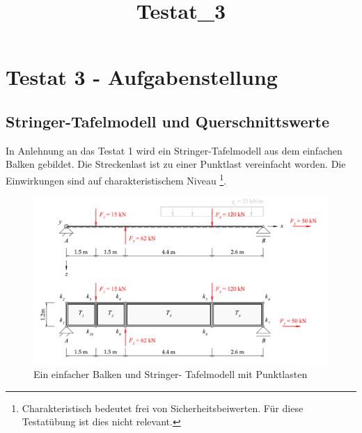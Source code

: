 \documentclass[
  12pt,
  letterpaper,
  DIV=11,
  egregdoesnotlikesansseriftitles]{scrartcl}
\title{Testat\_3}
\author{}
\date{}
\renewcommand{\maketitle}{}
\begin{document}
\maketitle
\ifdefined\Shaded\renewenvironment{Shaded}{\begin{tcolorbox}[sharp corners, interior hidden, borderline west={3pt}{0pt}{shadecolor}, enhanced, frame hidden, boxrule=0pt, breakable]}{\end{tcolorbox}}\fi

\hypertarget{testat-3---aufgabenstellung}{%
\section{Testat 3 -
Aufgabenstellung}\label{testat-3---aufgabenstellung}}

\hypertarget{stringer-tafelmodell-und-querschnittswerte}{%
\subsection{Stringer-Tafelmodell und
Querschnittswerte}\label{stringer-tafelmodell-und-querschnittswerte}}

In Anlehnung an das Testat 1 wird ein Stringer-Tafelmodell aus dem
einfachen Balken gebildet. Die Streckenlast ist zu einer Punktlast
vereinfacht worden. Die Einwirkungen sind auf charakteristischem Niveau
\footnote{Charakteristisch bedeutet frei von Sicherheitsbeiwerten. Für
  diese Testatübung ist dies nicht relevant.}.

\begin{figure}[H]

{\centering \includegraphics{BSI_HS23_Testat_03_files/mediabag/../images/Testat_03_HS23.pdf}

}

\caption{\label{fig-system}Ein einfacher Balken und Stringer-
Tafelmodell mit Punktlasten}

\end{figure}
\end{document}
